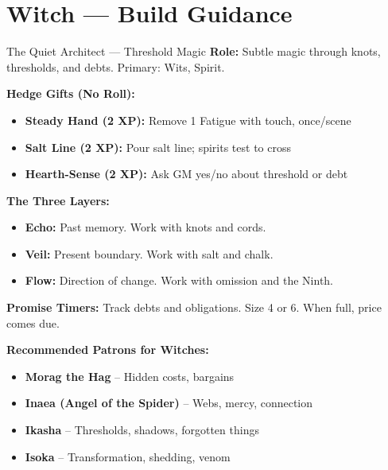 \documentclass[10pt]{article}
\begin{document}
\newpage


\section*{Witch --- Build Guidance}

\begin{tipbox}{The Quiet Architect --- Threshold Magic}
    \textbf{Role:} Subtle magic through knots, thresholds, and debts. Primary: Wits, Spirit.
    
    \textbf{Hedge Gifts (No Roll):}
    \begin{itemize}
        \item \textbf{Steady Hand (2 XP):} Remove 1 Fatigue with touch, once/scene
        \item \textbf{Salt Line (2 XP):} Pour salt line; spirits test to cross
        \item \textbf{Hearth-Sense (2 XP):} Ask GM yes/no about threshold or debt
    \end{itemize}
    
    \textbf{The Three Layers:}
    \begin{itemize}
        \item \textbf{Echo:} Past memory. Work with knots and cords.
        \item \textbf{Veil:} Present boundary. Work with salt and chalk.
        \item \textbf{Flow:} Direction of change. Work with omission and the Ninth.
    \end{itemize}
    
    \textbf{Promise Timers:} Track debts and obligations. Size 4 or 6. When full, price comes due.
    
    \textbf{Recommended Patrons for Witches:}
    \begin{itemize}
        \item \textbf{Morag the Hag} -- Hidden costs, bargains
        \item \textbf{Inaea (Angel of the Spider)} -- Webs, mercy, connection
        \item \textbf{Ikasha} -- Thresholds, shadows, forgotten things
        \item \textbf{Isoka} -- Transformation, shedding, venom
    \end{itemize}
\end{tipbox}
\end{document}
